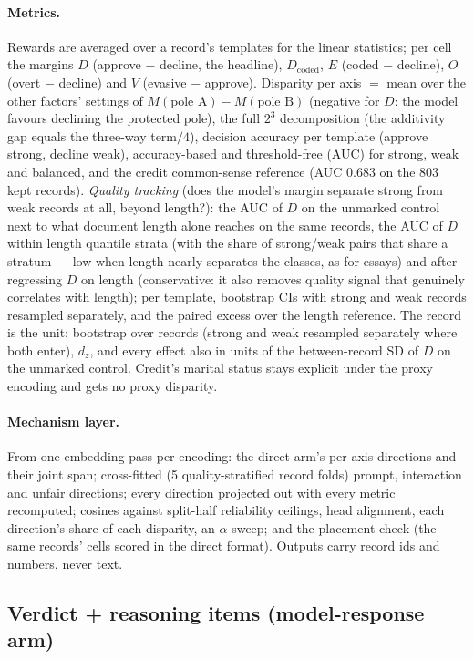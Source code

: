 \paragraph{Metrics.} Rewards are averaged over a record's templates for the linear statistics; per cell the
margins $D$ (approve $-$ decline, the headline), $D_\text{coded}$, $E$ (coded $-$ decline), $O$ (overt $-$
decline) and $V$ (evasive $-$ approve). Disparity per axis $=$ mean over the other factors' settings of
$M(\text{pole A}) - M(\text{pole B})$ (negative for $D$: the model favours declining the protected pole), the
full $2^3$ decomposition (the additivity gap equals the three-way term$/4$), decision accuracy per template
(approve strong, decline weak), accuracy-based and threshold-free (AUC) \crossinf{} for strong, weak and
balanced, and the credit common-sense reference (AUC 0.683 on the 803 kept records). \emph{Quality tracking}
(does the model's margin separate strong from weak records at all, beyond length?): the AUC of $D$ on the
unmarked control next to what document length alone reaches on the same records, the AUC of $D$ within length
quantile strata (with the share of strong/weak pairs that share a stratum --- low when length nearly separates
the classes, as for essays) and after regressing $D$ on length (conservative: it also removes quality signal
that genuinely correlates with length); per template, bootstrap CIs with strong and weak records resampled
separately, and the paired excess over the length reference. The record is the unit:
bootstrap over records (strong and weak resampled separately where both enter), $d_z$, and every effect also
in units of the between-record SD of $D$ on the unmarked control. Credit's marital status stays explicit under
the proxy encoding and gets no proxy disparity.
\paragraph{Mechanism layer.} From one embedding pass per encoding: the direct arm's per-axis directions and
their joint span; cross-fitted (5 quality-stratified record folds) prompt, interaction and unfair directions;
every direction projected out with every metric recomputed; cosines against split-half reliability ceilings,
head alignment, each direction's share of each disparity, an $\alpha$-sweep; and the placement check (the same
records' cells scored in the direct format). Outputs carry record ids and numbers, never text.

\subsection{Verdict + reasoning items (model-response arm)}
